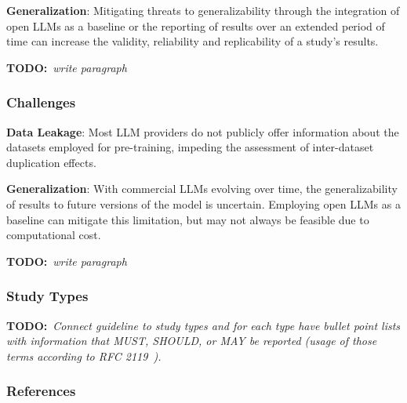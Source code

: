 \documentclass[11pt]{article}
\newcommand{\todo}[1]{{\textbf{TODO:}\ \textit{#1}}} %
\begin{document}
\textbf{Generalization}:
Mitigating threats to generalizability through the integration of open LLMs as a baseline or the reporting of results over an extended period of time can increase the validity, reliability and replicability of a study's results.

\todo{write paragraph}


\subsubsection{Challenges}
\textbf{Data Leakage}:
Most LLM providers do not publicly offer information about the datasets employed for pre-training, impeding the assessment of inter-dataset duplication effects.

\textbf{Generalization}:
With commercial LLMs evolving over time, the generalizability of results to future versions of the model is uncertain. Employing open LLMs as a baseline can mitigate this limitation, but may not always be feasible due to computational cost.


\todo{write paragraph}


\subsubsection{Study Types}
\todo{Connect guideline to study types and for each type have bullet point lists with information that MUST, SHOULD, or MAY be reported (usage of those terms according to RFC 2119~\cite{rfc2119}).}


\subsubsection{References}



\end{document}
